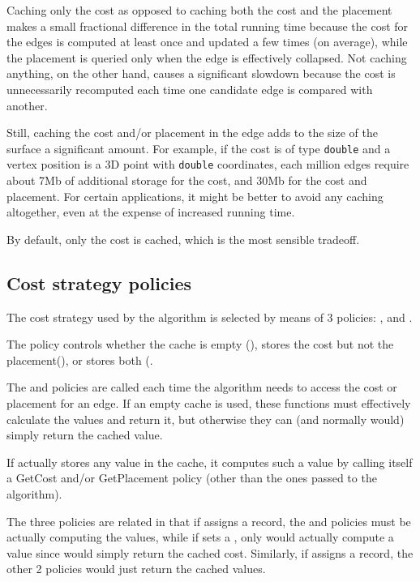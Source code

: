 Caching only the cost as opposed to caching both the cost and the placement makes a
small fractional difference in the total running time because the cost for the
edges is computed at least once and updated a few times (on average), while the 
placement is queried only when the edge is effectively collapsed. Not caching 
anything, on the other hand, causes a significant slowdown because the cost is
unnecessarily recomputed each time one candidate edge is compared with another.

Still, caching the cost and/or placement in the edge adds to the size of the surface 
a significant amount. For example, if the cost is of type {\tt double} and a vertex
position is a 3D point with {\tt double} coordinates, each million edges require 
about 7Mb of additional storage for the cost, and 30Mb for the cost and placement.
For certain applications, it might be better to avoid any caching altogether, even 
at the expense of increased running time.
 
By default, only the cost is cached, which is the most sensible tradeoff.

\subsection{Cost strategy policies}

The cost strategy used by the algorithm is selected by means of 3 policies: 
,  and . 

The  policy controls whether the cache is empty (), 
stores the cost but not the placement(), or stores both 
(.

The  and  policies are called each time
the algorithm needs to access the cost or placement for an edge.
If an empty cache is used, these functions must effectively
calculate the values and return it, but otherwise they can 
(and normally would) simply return the cached value.

If  actually stores any value in the cache, it computes
such a value by calling itself a GetCost and/or GetPlacement
policy (other than the ones passed to the algorithm).

The three policies are related in that if 
assigns a  record, the  and  policies
must be actually computing the values, while if  sets a 
, only  would actually compute a value since
 would simply return the cached cost.
Similarly, if  assigns a  record, 
the other 2 policies would just return the cached values.

